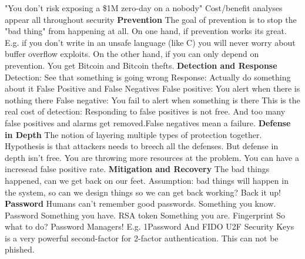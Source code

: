 \documentclass[11 pt]{scrartcl}
\begin{document}
    \ii "You don't risk exposing a \$1M zero-day on a nobody"
    \ii Cost/benefit analyses appear all throughout security
\itemend
\textbf{Prevention}\newline
The goal of prevention is to stop the "bad thing" from happening at all. On one hand, if prevention works its great. E.g. if you don't write in an unsafe language (like C) you will never worry about buffer overflow exploits. On the other hand, if you can only depend on prevention. You get Bitcoin and Bitcoin thefts.\newline
\textbf{Detection and Response}\newline
Detection: See that something is going wrong\newline
Response: Actually do something about it\newline
False Positive and False Negatives\newline
False positive: You alert when there is nothing there \newline
False negative: You fail to alert when something is there \newline
This is the real cost of detection:\newline
Responding to false positives is not free. And too many false positives and alarms get removed.False negatives mean a failure.\newline
\textbf{Defense in Depth}\newline
The notion of layering multiple types of protection together. Hypothesis is that attackers needs to breech all the defenses. But defense in depth isn't free. You are throwing more resources at the problem. You can have a incresead false positive rate.\newline
\textbf{Mitigation and Recovery}
The bad things happened, can we get back on our feet. Assumption: bad things will happen in the system, so can we design things so we can get back working? Back it up!\newline
\textbf{Password}\newline
Humans can't remember good passwords.\newline
Something you know. Password\newline
Something you have. RSA token\newline
Something you are. Fingerprint\newline
So what to do? Password Managers! E.g. 1Password\newline
And FIDO U2F Security Keys is a very powerful second-factor for 2-factor authentication. This can not be phished.
\newpage
\end{document}
